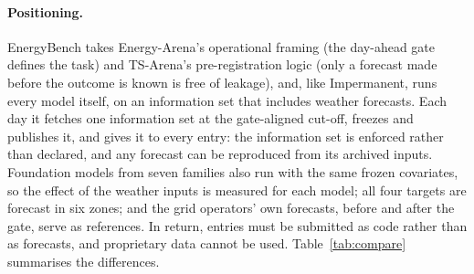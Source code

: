 \documentclass[11pt,a4paper]{article}
\begin{document}
\paragraph{Positioning.} EnergyBench takes Energy-Arena's operational framing (the day-ahead gate defines the task)
and TS-Arena's pre-registration logic (only a forecast made before the outcome is known is free of leakage), and, like
Impermanent, runs every model itself, on an information set that includes weather forecasts. Each day it fetches one information set at the gate-aligned
cut-off, freezes and publishes it, and gives it to every entry: the information set is enforced rather than declared,
and any forecast can be reproduced from its archived inputs. Foundation models from seven families also run with the
same frozen covariates, so the effect of the weather inputs is measured for each model; all four targets
are forecast in six zones; and the grid operators' own forecasts, before and after the gate, serve as references. In
return, entries must be submitted as code rather than as forecasts, and proprietary data cannot be used.
Table~\ref{tab:compare} summarises the differences.
\end{document}
